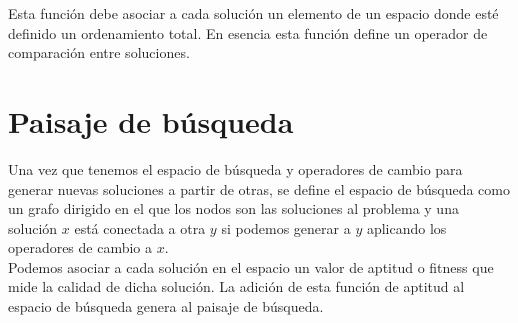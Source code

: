 Esta función debe asociar a cada solución un elemento de un espacio donde esté definido un ordenamiento total. En esencia esta función define un operador de comparación entre soluciones.
\section{Paisaje de búsqueda}
Una vez que tenemos el espacio de búsqueda y operadores de cambio para generar nuevas soluciones a partir de otras, se define el espacio de búsqueda como un grafo dirigido en el que los nodos son las soluciones al problema y una solución $x$ está conectada a otra $y$ si podemos generar a $y$ aplicando los operadores de cambio a $x$.\\

Podemos asociar a cada solución en el espacio un valor de aptitud o fitness que mide la calidad de dicha solución. La adición de esta función de aptitud al espacio de búsqueda genera al paisaje de búsqueda.
